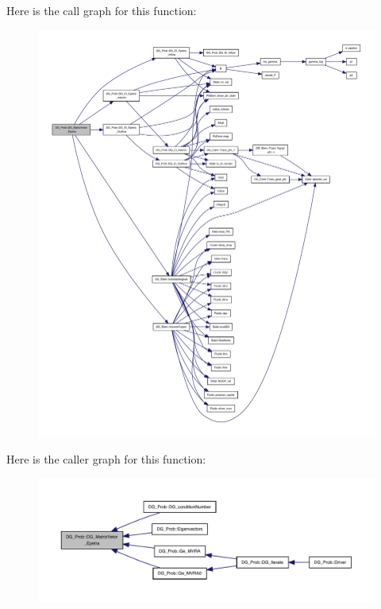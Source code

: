 Here is the call graph for this function\+:
\nopagebreak
\begin{figure}[H]
\begin{center}
\leavevmode
\includegraphics[width=350pt]{classDG__Prob_a68ffd2ab09f51c7b29b88b006fbc5c49_cgraph}
\end{center}
\end{figure}
Here is the caller graph for this function\+:
\nopagebreak
\begin{figure}[H]
\begin{center}
\leavevmode
\includegraphics[width=350pt]{classDG__Prob_a68ffd2ab09f51c7b29b88b006fbc5c49_icgraph}
\end{center}
\end{figure}
\mbox{\label{classDG__Prob_a2e99df149cf01faccb484389f8627d33}} 
